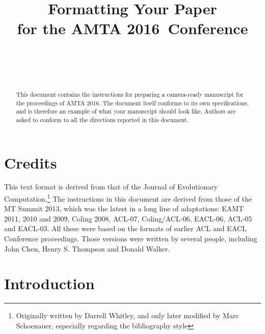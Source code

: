 \documentclass[]{article}
\newcommand{\confname}{AMTA 2016}
\begin{document}
\title{\bf Formatting Your Paper \\
  for the \confname~Conference}  

\author{ \hfill  {}\\ 
         \hfill {}\\ 
\AND
        \hfill {}\\
}

\maketitle
\pagestyle{empty}

\begin{abstract}
  This document contains the instructions for preparing a camera-ready
  manuscript for the proceedings of \confname . The document itself
  conforms to its own specifications, and is therefore an example of
  what your manuscript should look like. Authors are asked to conform
  to all the directions reported in this document.
\end{abstract}

\section{Credits}

This text format is derived from that of the Journal of Evolutionary
Computation.\footnote{Originally written by Darrell Whitley, and only
  later modified by Marc Schoenauer, especially regarding the
  bibliography style} The instructions in this document are derived
from those of the MT Summit 2013, %
which was the latest in a long line of adaptations: EAMT 2011, 2010
and 2009, Coling 2008, ACL-07, Coling/ACL-06, EACL-06, ACL-05 and
EACL-03.  All these were based on the formats of earlier ACL and EACL
Conference proceedings.  Those versions were written by several
people, including John Chen, Henry S. Thompson and Donald Walker.

\section{Introduction}
\end{document}
